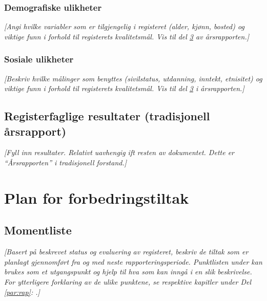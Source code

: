 \documentclass[norsk, a4paper, twocolumn]{report}
\newcommand{\guide}[1] {
	\textit{[\textcolor{guidegray}{#1}]}
	}
\begin{document}
\section{Demografiske ulikheter}\label{sec:demuli}
\guide{Angi hvilke variabler som er tilgjengelig i registeret (alder, kjønn,
bosted) og viktige funn i forhold til registerets kvalitetsmål. Vis til del
\ref{part:res} av årsrapporten.}

\section{Sosiale ulikheter}\label{sec:sosuli}
\guide{Beskriv hvilke målinger som benyttes (sivilstatus, utdanning, inntekt,
etnisitet) og viktige funn i forhold til registerets kvalitetsmål. Vis til del
\ref{part:res} i årsrapporten.}


\chapter{Registerfaglige resultater (tradisjonell årsrapport)}\label{part:res}


\guide{Fyll inn resultater. Relativt uavhengig ift resten av dokumentet. Dette
er ``Årsrapporten'' i tradisjonell forstand.}




\onecolumn
\part{Plan for forbedringstiltak}
\chapter{Momentliste}
\guide{Basert på beskrevet status og evaluering av registeret, beskriv de
tiltak som er planlagt gjennomført fra og med neste rapporteringsperiode.
Punktlisten under kan brukes som et utgangspunkt og hjelp til hva som kan
inngå i en slik beskrivelse. For ytterligere forklaring av de ulike punktene,
se respektive kapitler under Del \ref{par:rap}: \nameref{par:rap}.}
\end{document}
